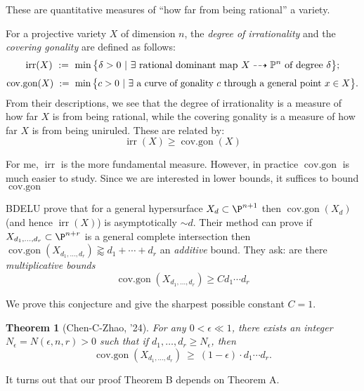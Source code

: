 \documentclass[12pt]{article}
\theoremstyle{plain}
\newtheorem{Lthm}{Theorem}
\DeclareMathOperator{\irr}{irr}
\DeclareMathOperator{\cov}{cov.gon}
\newcommand{\mb}[1]{\mathbb{#1}}
\DeclareMathOperator{\cg}{cov.gon}
\begin{document}
{\color{red} These are quantitative measures of ``how far from being rational'' a variety. }

For a projective variety $X$ of dimension $n$, the \emph{degree of irrationality} and the \emph{covering gonality} are defined as follows:
\[ \irr(X)\ :=\ \min\big\{\delta>0\ |\ \exists\textup{ rational dominant map } X\dashrightarrow \mb{P}^n\textup{ of degree }\delta\big\}; \]
\[ \cov(X)\ :=\ \min\big\{c>0\ |\ \exists\textup{ a curve of gonality } c \textup{ through a general point } x\in X\big\}.\]
{\color{red} From their descriptions, we see that the degree of irrationality is a measure of how far $X$ is from being rational, while the covering gonality is a measure of how far $X$ is from being uniruled.} These are related by: 
\[ \irr(X) \geq \cg(X) \]

{\color{red} For me, $\irr$ is the more fundamental measure. However, in practice $\cg$ is much easier to study. Since we are interested in lower bounds, it suffices to bound $\cg$}

BDELU prove that for a general hypersurface $X_d \subset \P^{n+1}$ then $\cg(X_d)$ (and hence $\irr(X)$) is asymptotically $\sim d$. Their method can prove if $X_{d_1, \dots, d_r} \subset \P^{n+r}$ is a general complete intersection then $\cg(X_{d_1, \dots, d_r}) \gtrapprox d_1 + \cdots + d_r$ an \textit{additive} bound. They ask: are there \textit{multiplicative bounds}
\[ \cg(X_{d_1, \dots, d_r}) \ge C d_1 \cdots d_r \]

{\color{red} We prove this conjecture and give the sharpest possible constant $C = 1$.}

\begin{Lthm}[Chen-C-Zhao, '24]
For any $0 < \epsilon \ll 1$, there exists an integer $N_{\epsilon} = N(\epsilon, n, r) > 0$ such that if $d_1, \dots, d_r \ge N_\epsilon$, then
\[ \cg(X_{d_1, \dots, d_r}) \ \geq \  (1-\epsilon) \cdot d_{1} \cdots d_{r}. \]
\end{Lthm}

{\color{red} It turns out that our proof Theorem B depends on Theorem A. }
\end{document}
